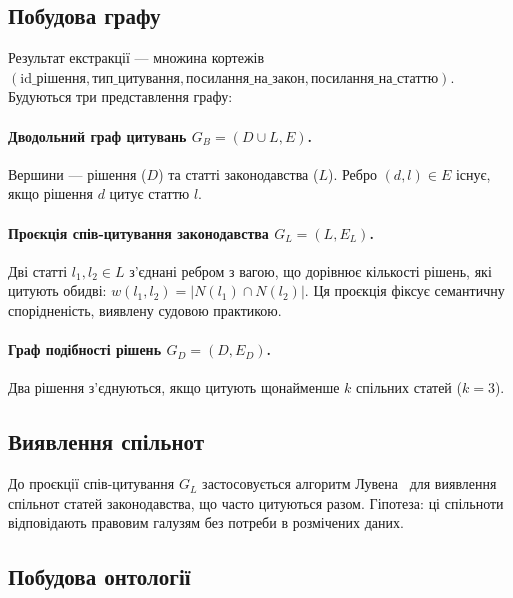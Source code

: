 \documentclass[11pt]{article}
\begin{document}
\subsection{Побудова графу}

Результат екстракції --- множина кортежів $(\text{id\_рішення}, \text{тип\_цитування}, \text{посилання\_на\_закон}, \text{посилання\_на\_статтю})$.
Будуються три представлення графу:

\paragraph{Дводольний граф цитувань $G_B = (D \cup L, E)$.}
Вершини --- рішення ($D$) та статті законодавства ($L$).
Ребро $(d, l) \in E$ існує, якщо рішення $d$ цитує статтю $l$.

\paragraph{Проєкція спів-цитування законодавства $G_L = (L, E_L)$.}
Дві статті $l_1, l_2 \in L$ з'єднані ребром з вагою, що дорівнює кількості рішень, які цитують обидві: $w(l_1, l_2) = |N(l_1) \cap N(l_2)|$.
Ця проєкція фіксує семантичну спорідненість, виявлену судовою практикою.

\paragraph{Граф подібності рішень $G_D = (D, E_D)$.}
Два рішення з'єднуються, якщо цитують щонайменше $k$ спільних статей ($k=3$).

\subsection{Виявлення спільнот}

До проєкції спів-цитування $G_L$ застосовується алгоритм Лувена~\citep{blondel2008louvain} для виявлення спільнот статей законодавства, що часто цитуються разом.
Гіпотеза: ці спільноти відповідають правовим галузям без потреби в розмічених даних.

\subsection{Побудова онтології}
\end{document}
